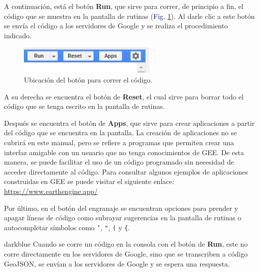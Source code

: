 \documentclass[
  12pt,
  letterpaper,
  twoside]{book}
\begin{document}
A continuación, está el botón \textbf{Run}, que sirve para correr, de principio a fin, el código que se muestra en la pantalla de rutinas (\textcolor{darkblue}{Fig.} \ref{fig:f215}). Al darle clic a este botón se envía el código a los servidores de Google y se realiza el procedimiento indicado.

\begin{figure}[H]

{\centering \includegraphics[width=0.5\linewidth]{Img/run} 

}

\caption{Ubicación del botón para correr el código.}\label{fig:f215}
\end{figure}

A su derecha se encuentra el botón de \textbf{Reset}, el cual sirve para borrar todo el código que se tenga escrito en la pantalla de rutinas.

Después se encuentra el botón de \textbf{Apps}, que sirve para crear aplicaciones a partir del código que se encuentra en la pantalla. La creación de aplicaciones no se cubrirá en este manual, pero se refiere a programas que permiten crear una interfaz amigable con un usuario que no tenga conocimientos de GEE. De esta manera, se puede facilitar el uso de un código programado sin necesidad de acceder directamente al código. Para consultar algunos ejemplos de aplicaciones construidas en GEE se puede visitar el siguiente enlace: \url{https://www.earthengine.app/}

Por último, en el botón del engranaje se encuentran opciones para prender y apagar líneas de código como subrayar sugerencias en la pantalla de rutinas o autocompletar símbolos como \texttt{’}, \texttt{"}, \texttt{(} y \texttt{\{}.

\begin{bluebox2}

\begin{awesomeblock}{5pt}{\faLightbulb}{darkblue}
Cuando se corre un código en la consola con el botón de \textbf{Run}, este no corre directamente en los servidores de Google, sino que se transcriben a código GeoJSON, se envían a los servidores de Google y se espera una respuesta.

\end{awesomeblock}

\end{bluebox2}
\end{document}
